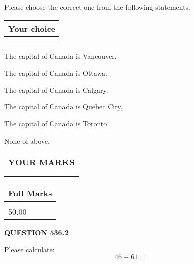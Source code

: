 \documentclass[12pt]{article}
\begin{document}
  
Please choose the correct one from the following statements.
  
  
\noindent\hspace{3.0in} \begin{tabular}{|l|}
\hline
Your choice \\
\hline
 \\ 
 \\ 
\hline
\end{tabular}
  
  
 
 
The capital of Canada is Vancouver.
 
 
The capital of Canada is Ottawa.
 
 
The capital of Canada is Calgary.
 
 
The capital of Canada is Quebec City.
 
 
The capital of Canada is Toronto.
 
 
 None of above.
 
 
  
\vspace{0.2in}
  
\noindent\begin{tabular}{|l|}
\hline
 YOUR MARKS  \\
\hline
 \\ 
 \\ 
\hline
\end{tabular}
\hspace{0.05in} \begin{tabular}{|l|}
\hline
 Full Marks  \\
\hline
 \\ 
50.00 \\
\hline
\end{tabular}
{\textbf{\Large{QUESTION
536.2 
}}}
  
  
 
Please calculate:
\begin{equation}
46 +  %
61 = \nonumber
\end{equation}
 

 

 
   
   
 \vspace{0.2in}
 
   
   
   
   
\end{document}
